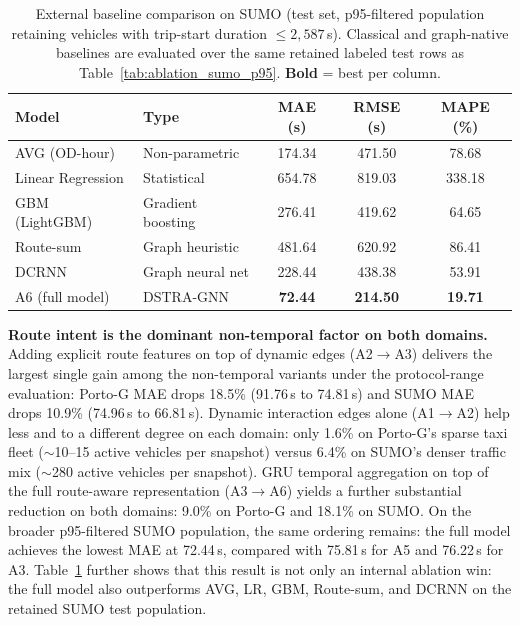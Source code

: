 \begin{table}[t]
    \centering
    \caption{External baseline comparison on SUMO (test set, p95-filtered population retaining vehicles with trip-start duration $\leq 2{,}587$\,s). Classical and graph-native baselines are evaluated over the same retained labeled test rows as Table~\ref{tab:ablation_sumo_p95}. \textbf{Bold} = best per column.}
    \label{tab:baselines_sumo_p95}
    {\footnotesize\setlength{\tabcolsep}{4pt}%
    \begin{tabular}{@{}llccc@{}}
        \toprule
        \textbf{Model} & \textbf{Type} & \textbf{MAE (s)} & \textbf{RMSE (s)} & \textbf{MAPE (\%)} \\
        \midrule
        AVG (OD-hour)       & Non-parametric   & 174.34 & 471.50 & 78.68 \\
        Linear Regression   & Statistical      & 654.78 & 819.03 & 338.18 \\
        GBM (LightGBM)      & Gradient boosting & 276.41 & 419.62 & 64.65 \\
        Route-sum           & Graph heuristic  & 481.64 & 620.92 & 86.41 \\
        DCRNN~\cite{dcrnn2018} & Graph neural net & 228.44 & 438.38 & 53.91 \\
        A6 (full model)     & DSTRA-GNN        & \textbf{72.44} & \textbf{214.50} & \textbf{19.71} \\
        \bottomrule
    \end{tabular}}%
\end{table}

\textbf{Route intent is the dominant non-temporal factor on both domains.} Adding explicit route features on top of dynamic edges (A2$\to$A3) delivers the largest single gain among the non-temporal variants under the protocol-range evaluation: Porto-G MAE drops 18.5\% (91.76\,s to 74.81\,s) and SUMO MAE drops 10.9\% (74.96\,s to 66.81\,s). Dynamic interaction edges alone (A1$\to$A2) help less and to a different degree on each domain: only 1.6\% on Porto-G's sparse taxi fleet ($\sim$10--15 active vehicles per snapshot) versus 6.4\% on SUMO's denser traffic mix ($\sim$280 active vehicles per snapshot). GRU temporal aggregation on top of the full route-aware representation (A3$\to$A6) yields a further substantial reduction on both domains: 9.0\% on Porto-G and 18.1\% on SUMO. On the broader p95-filtered SUMO population, the same ordering remains: the full model achieves the lowest MAE at 72.44\,s, compared with 75.81\,s for A5 and 76.22\,s for A3. Table~\ref{tab:baselines_sumo_p95} further shows that this result is not only an internal ablation win: the full model also outperforms AVG, LR, GBM, Route-sum, and DCRNN on the retained SUMO test population.


